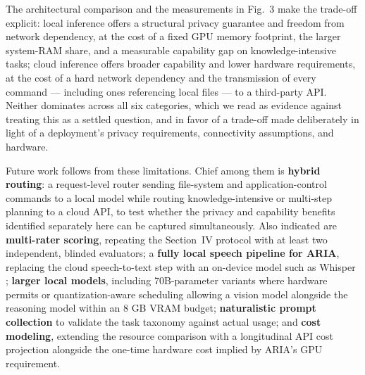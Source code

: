 \documentclass[conference]{IEEEtran}
\begin{document}
The architectural comparison and the measurements in Fig.~3 make the trade-off explicit: local inference offers a structural privacy guarantee and freedom from network dependency, at the cost of a fixed GPU memory footprint, the larger system-RAM share, and a measurable capability gap on knowledge-intensive tasks; cloud inference offers broader capability and lower hardware requirements, at the cost of a hard network dependency and the transmission of every command --- including ones referencing local files --- to a third-party API. Neither dominates across all six categories, which we read as evidence against treating this as a settled question, and in favor of a trade-off made deliberately in light of a deployment's privacy requirements, connectivity assumptions, and hardware.

Future work follows from these limitations. Chief among them is \textbf{hybrid routing}: a request-level router sending file-system and application-control commands to a local model while routing knowledge-intensive or multi-step planning to a cloud API, to test whether the privacy and capability benefits identified separately here can be captured simultaneously. Also indicated are \textbf{multi-rater scoring}, repeating the Section~IV protocol with at least two independent, blinded evaluators; a \textbf{fully local speech pipeline for ARIA}, replacing the cloud speech-to-text step with an on-device model such as Whisper \cite{ref13}; \textbf{larger local models}, including 70B-parameter variants where hardware permits or quantization-aware scheduling \cite{ref20} allowing a vision model alongside the reasoning model within an 8 GB VRAM budget; \textbf{naturalistic prompt collection} to validate the task taxonomy against actual usage; and \textbf{cost modeling}, extending the resource comparison with a longitudinal API cost projection alongside the one-time hardware cost implied by ARIA's GPU requirement.
\end{document}
